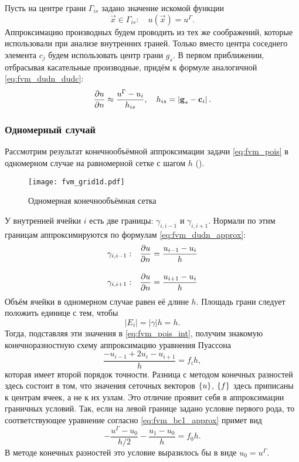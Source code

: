 Пусть на центре грани $\Gamma_{is}$ задано 
значение искомой функции
\begin{equation}
\label{eq:fvm_bc1}
\vec x \in \Gamma_{is}: \quad u(\vec x) = u^\Gamma.
\end{equation}
Аппроксимацию производных
будем проводить из тех же соображений, которые использовали
при анализе внутренних граней. Только вместо центра соседнего элемента
$c_j$ будем использовать центр грани $g_s$.
В первом приближении, отбрасывая касательные производные, придём к формуле аналогичной \cref{eq:fvm_dudn_dudc}:
\begin{equation}
\label{eq:fvm_bc1_approx}
\frac{\partial u}{\partial n} \approx \frac{u^\Gamma - u_i}{h_{is}}, \quad h_{is} = \left| \boldsymbol{\rm g}_s  - \boldsymbol{\rm c}_i \right|.
\end{equation}

\subsubsection{Одномерный случай}
Рассмотрим результат конечнообъёмной аппроксимации
задачи \cref{eq:fvm_pois} в одномерном случае
на равномерной сетке с шагом $h$ ().

\begin{figure}[h!]
\centering
\texttt{[image: fvm\_grid1d.pdf]}
\caption{Одномерная конечнообъёмная сетка}
\label{fig:fvm_grid1d}
\end{figure}

У внутренней ячейки $i$ есть две границы: $\gamma_{i,i-1}$ и $\gamma_{i,i+1}$.
Нормали по этим границам аппроксимируются по формулам \cref{eq:fvm_dudn_approx}:
\begin{align*}
\gamma_{i,i-1}: \quad& \frac{\partial u}{\partial n} = \frac{u_{i-1}-u_{i}}{h} \\[10pt]
\gamma_{i,i+1}: \quad& \frac{\partial u}{\partial n} = \frac{u_{i+1}-u_{i}}{h}
\end{align*}
Объём ячейки в одномерном случае равен её длине $h$.
Площадь грани следует положить единице с тем, чтобы
$$
|E_i| = |\gamma| h = h.
$$
Тогда, подставляя эти значения в \cref{eq:fvm_pois_int},
получим знакомую конечноразностную схему аппроксимацию уравнения Пуассона
$$
\frac{-u_{i-1} + 2 u_i - u_{i+1}}{h} = f_i h,
$$
которая имеет второй порядок точности.
Разница с методом конечных разностей здесь состоит в том,
что значения сеточных векторов $\left\{u\right\}$, $\left\{f\right\}$ здесь
приписаны к центрам ячеек, а не к их узлам.
Это отличие проявит себя в аппроксимации граничных условий.
Так, если на левой границе задано условие первого рода, то соответствующее уравнение
согласно \cref{eq:fvm_bc1_approx}
примет вид
$$
-\frac{u^\Gamma - u_0}{h/2} - \frac{u_1 - u_0}{h} = f_0 h.
$$
В методе конечных разностей это условие выразилось бы в виде $u_0 = u^\Gamma$.

